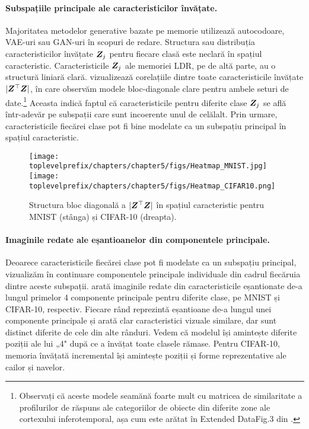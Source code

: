 \documentclass[../../book-main_ro.tex]{subfiles}
\begin{document}
\paragraph{Subspațiile principale ale caracteristicilor învățate.}
Majoritatea metodelor generative bazate pe memorie utilizează autocodoare, VAE-uri sau GAN-uri în scopuri de redare. Structura sau distribuția caracteristicilor învățate $\bm{Z}_j$ pentru fiecare clasă este neclară în spațiul caracteristic. Caracteristicile $\bm{Z}_j$ ale memoriei LDR, pe de altă parte, au o structură liniară clară.  vizualizează corelațiile dintre toate caracteristicile învățate $|\bm{Z}^\top\bm{Z}|$, în care observăm modele bloc-diagonale clare pentru ambele seturi de date.\footnote{Observați că aceste modele seamănă foarte mult cu matricea de similaritate a profilurilor de răspuns ale categoriilor de obiecte din diferite zone ale cortexului inferotemporal, așa cum este arătat în Extended DataFig.3 din \cite{Bao2020AMO}.} Aceasta indică faptul că caracteristicile pentru diferite clase $\bm{Z}_j$ se află într-adevăr pe subspații care sunt incoerente unul de celălalt. Prin urmare, caracteristicile fiecărei clase pot fi bine modelate ca un subspațiu principal în spațiul caracteristic.

\begin{figure}[tb]
\centering
\texttt{[image: \\toplevelprefix/chapters/chapter5/figs/Heatmap\_MNIST.jpg]}
\texttt{[image: \\toplevelprefix/chapters/chapter5/figs/Heatmap\_CIFAR10.png]}
\caption{\small Structura bloc diagonală a $|\bm{Z}^\top \bm{Z}|$ în spațiul caracteristic pentru MNIST (stânga) și CIFAR-10 (dreapta).}
\label{fig:cifar_10_pca_sampling_main}
\end{figure}



\paragraph{Imaginile redate ale eșantioanelor din componentele principale.}
Deoarece caracteristicile fiecărei clase pot fi modelate ca un subspațiu principal, vizualizăm în continuare componentele principale individuale din cadrul fiecăruia dintre aceste subspații.  arată imaginile redate din caracteristicile eșantionate de-a lungul primelor 4 componente principale pentru diferite clase, pe MNIST și CIFAR-10, respectiv. Fiecare rând reprezintă eșantioane de-a lungul unei componente principale și arată clar caracteristici vizuale similare, dar sunt distinct diferite de cele din alte rânduri. Vedem că modelul își amintește diferite poziții ale lui „4" după ce a învățat toate clasele rămase. Pentru CIFAR-10, memoria învățată incremental își amintește poziții și forme reprezentative ale cailor și navelor.
\end{document}
